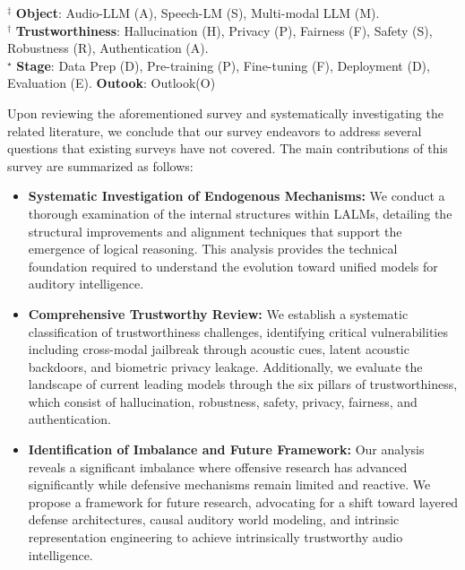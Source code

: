 \documentclass{llmxive}
\begin{document}
\begin{table}[htbp]
\vspace{1.2mm}

\tiny
$^{\ddagger}$ \textbf{Object}: Audio-LLM (A), Speech-LM (S), Multi-modal LLM (M). \\
$^{\dagger}$ \textbf{Trustworthiness}: Hallucination (H), Privacy (P), Fairness (F), Safety (S), Robustness (R), Authentication (A). \\
$^{\star}$ \textbf{Stage}: Data Prep (D), Pre-training (P), Fine-tuning (F), Deployment (D), Evaluation (E).
\textbf{Outook}: Outlook(O)
\label{tab:1} 
\caption{Comparison with existing surveys. }
\label{tab:survey_comparison}
\end{table}

Upon reviewing the aforementioned survey and systematically investigating the related literature, we conclude that our survey endeavors to address several questions that existing surveys have not covered. The main contributions of this survey are summarized as follows:
\begin{itemize}[leftmargin=*]
   \item \textbf{Systematic Investigation of Endogenous Mechanisms:} We conduct a thorough examination of the internal structures within LALMs, detailing the structural improvements and alignment techniques that support the emergence of logical reasoning. This analysis provides the technical foundation required to understand the evolution toward unified models for auditory intelligence.
    \item \textbf{Comprehensive Trustworthy Review:} We establish a systematic classification of trustworthiness challenges, identifying critical vulnerabilities including cross-modal jailbreak through acoustic cues, latent acoustic backdoors, and biometric privacy leakage. Additionally, we evaluate the landscape of current leading models through the six pillars of trustworthiness, which consist of hallucination, robustness, safety, privacy, fairness, and authentication.
    \item \textbf{Identification of Imbalance and Future Framework:} Our analysis reveals a significant imbalance where offensive research has advanced significantly while defensive mechanisms remain limited and reactive. We propose a framework for future research, advocating for a shift toward layered defense architectures, causal auditory world modeling, and intrinsic representation engineering to achieve intrinsically trustworthy audio intelligence.
\end{itemize}
\end{document}
